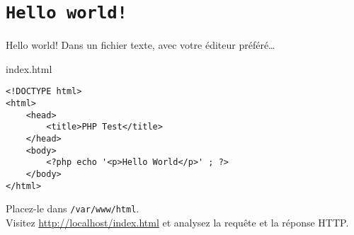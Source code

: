 

\section{\texttt{Hello world!}}

\begin{frame}[containsverbatim]{Hello world!}
Dans un fichier texte, avec votre éditeur préféré\ldots 
\begin{block}{index.html}
\begin{lstlisting}
<!DOCTYPE html>
<html>
    <head>
        <title>PHP Test</title>
    </head>
    <body>
        <?php echo '<p>Hello World</p>' ; ?>
    </body>
</html>
\end{lstlisting}
\end{block}
Placez-le dans \texttt{/var/www/html}.\\
Visitez \url{http://localhost/index.html} et analysez la requête et la réponse HTTP.
\end{frame}
